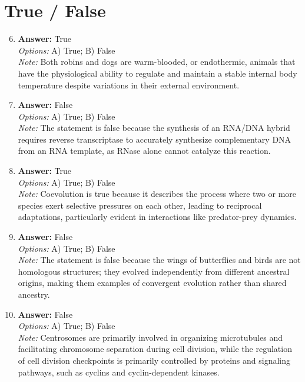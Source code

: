 \documentclass[12pt]{article}
\begin{document}
\section*{True / False}
\begin{enumerate}[label=\arabic*.]
\setcounter{enumi}{5}
\item \textbf{Answer:} True
\\ \textit{Options:} A) True; B) False
\\ \textit{Note:} Both robins and dogs are warm-blooded, or endothermic, animals that have the physiological ability to regulate and maintain a stable internal body temperature despite variations in their external environment.
\item \textbf{Answer:} False
\\ \textit{Options:} A) True; B) False
\\ \textit{Note:} The statement is false because the synthesis of an RNA/DNA hybrid requires reverse transcriptase to accurately synthesize complementary DNA from an RNA template, as RNase alone cannot catalyze this reaction.
\item \textbf{Answer:} True
\\ \textit{Options:} A) True; B) False
\\ \textit{Note:} Coevolution is true because it describes the process where two or more species exert selective pressures on each other, leading to reciprocal adaptations, particularly evident in interactions like predator-prey dynamics.
\item \textbf{Answer:} False
\\ \textit{Options:} A) True; B) False
\\ \textit{Note:} The statement is false because the wings of butterflies and birds are not homologous structures; they evolved independently from different ancestral origins, making them examples of convergent evolution rather than shared ancestry.
\item \textbf{Answer:} False
\\ \textit{Options:} A) True; B) False
\\ \textit{Note:} Centrosomes are primarily involved in organizing microtubules and facilitating chromosome separation during cell division, while the regulation of cell division checkpoints is primarily controlled by proteins and signaling pathways, such as cyclins and cyclin-dependent kinases.
\end{enumerate}
\end{document}
